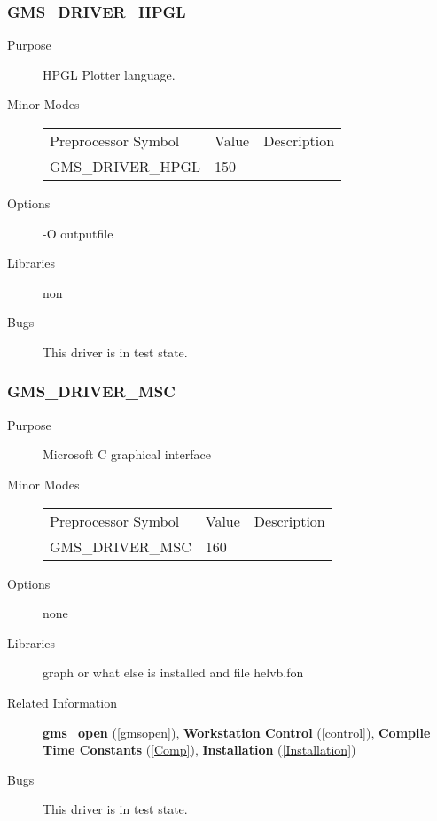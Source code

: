 \subsubsection{GMS\_DRIVER\_HPGL\label{hpgl}}
\begin{description}
\item[Purpose]\mbox{}


HPGL Plotter language.
\item[Minor Modes]\mbox{}


\begin{center}
\begin{tabular}{lll}\hline
Preprocessor Symbol & Value& Description\\ 
GMS\_DRIVER\_HPGL &  150& \\ 
\hline\end{tabular}
\end{center}

\item[Options]\mbox{}


-O outputfile
\item[Libraries]\mbox{}


non
\item[Bugs]\mbox{}


This driver is in test state.   
\end{description}



\newpage



\subsubsection{GMS\_DRIVER\_MSC\label{msc}}
\begin{description}
\item[Purpose]\mbox{}


Microsoft C graphical interface
\item[Minor Modes]\mbox{}


\begin{center}
\begin{tabular}{lll}\hline
Preprocessor Symbol & Value& Description\\ 
GMS\_DRIVER\_MSC &  160& \\ 
\hline\end{tabular}
\end{center}

\item[Options]\mbox{}


none
\item[Libraries]\mbox{}


graph or what else is installed  and
file helvb.fon
\item[Related Information]\mbox{}


{\bf gms\_open} (\ref{gmsopen}), 
{\bf Workstation Control} (\ref{control}), 
{\bf Compile Time Constants} (\ref{Comp}), 
{\bf Installation} (\ref{Installation}) 
\item[Bugs]\mbox{}


This driver is in test state.   
\end{description}



